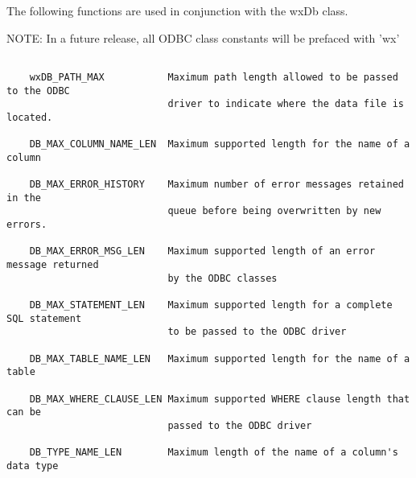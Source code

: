 
The following functions are used in conjunction with the wxDb class.
\begin{indented}{1cm}

\label{FUNCwxdbgetconnection}

\label{FUNCwxdbfreeconnection}

\label{FUNCwxdbcloseconnections}

\label{FUNCwxdbconnectionsinuse}

\label{FUNCwxdbsqllog}

\label{FUNCwxdbgetdatasource}

\end{indented}


NOTE: In a future release, all ODBC class constants will be prefaced with 'wx'

\begin{verbatim}

    wxDB_PATH_MAX           Maximum path length allowed to be passed to the ODBC
                            driver to indicate where the data file is located.

    DB_MAX_COLUMN_NAME_LEN  Maximum supported length for the name of a column

    DB_MAX_ERROR_HISTORY    Maximum number of error messages retained in the
                            queue before being overwritten by new errors.

    DB_MAX_ERROR_MSG_LEN    Maximum supported length of an error message returned 
                            by the ODBC classes

    DB_MAX_STATEMENT_LEN    Maximum supported length for a complete SQL statement
                            to be passed to the ODBC driver

    DB_MAX_TABLE_NAME_LEN   Maximum supported length for the name of a table

    DB_MAX_WHERE_CLAUSE_LEN Maximum supported WHERE clause length that can be 
                            passed to the ODBC driver

    DB_TYPE_NAME_LEN        Maximum length of the name of a column's data type
\end{verbatim}


